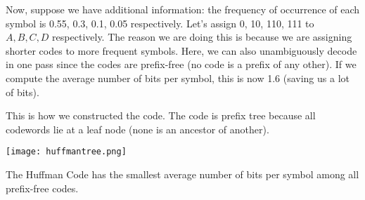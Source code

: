 Now, suppose we have additional information: the frequency of occurrence of each symbol is
0.55, 0.3, 0.1, 0.05 respectively. Let's assign 0, 10, 110, 111 to $A, B, C, D$ respectively.
The reason we are doing this is because we are assigning shorter codes to more frequent symbols.
Here, we can also unambiguously decode in one pass since the codes are prefix-free (no code is a prefix of
any other). If we compute the average number of bits per symbol, this is now 1.6 (saving us a lot of bits).

This is how we constructed the code. The code is prefix tree because all codewords lie at a leaf node (none is an ancestor of another).

\texttt{[image: huffmantree.png]}

\begin{theorem}
    The Huffman Code has the smallest average number of bits per symbol among all prefix-free codes.
\end{theorem}